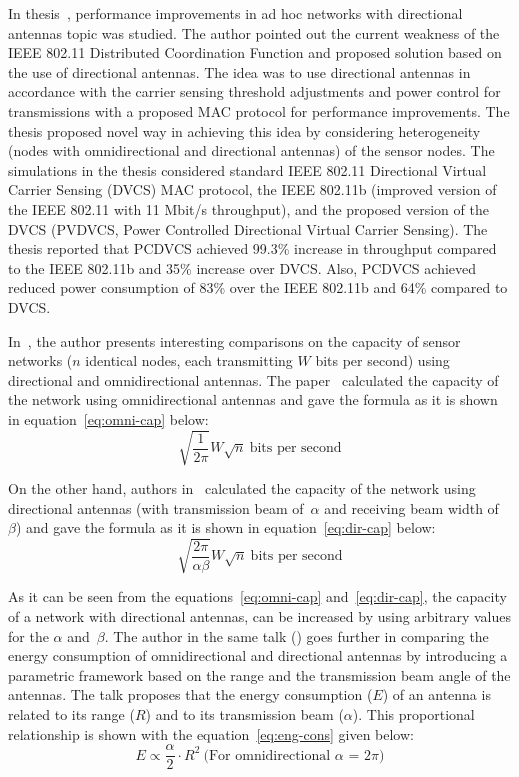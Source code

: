 \documentclass[12pt, oneandhalf, chaparabic, sees, ms]{metu}
\begin{document}
In thesis~\cite{bian2009}, performance improvements in ad hoc networks with directional antennas topic was studied. 
The author pointed out the current weakness of the IEEE 802.11
Distributed Coordination Function and proposed solution based on the use of directional antennas. 
The idea was to use directional antennas in accordance with the carrier sensing threshold adjustments and power control for transmissions 
with a proposed MAC protocol for performance improvements. The thesis proposed novel way in achieving this idea by considering 
heterogeneity (nodes with omnidirectional and directional antennas) of the sensor nodes. The simulations in the thesis considered standard
IEEE 802.11 Directional Virtual Carrier Sensing (DVCS) MAC protocol, the IEEE 802.11b (improved version of the IEEE 802.11 with 11 Mbit/s throughput), 
and the proposed version of the DVCS (PVDVCS, Power Controlled Directional Virtual Carrier Sensing).
The thesis reported that PCDVCS achieved 99.3\% increase in throughput compared to the IEEE 802.11b and 35\% increase over DVCS. 
Also, PCDVCS  achieved reduced power consumption of 83\% over the IEEE 802.11b and 64\% compared to DVCS.

In~\cite{kranakis2012}, the author presents interesting comparisons on the capacity of sensor networks ($n$ identical nodes, each transmitting $W$ bits per second) 
using directional and omnidirectional antennas. 
The paper~\cite{gupta2000} calculated the capacity of the network using omnidirectional antennas and gave the formula as it is shown in equation~\ref{eq:omni-cap} below: 
\begin{equation}
\sqrt{\frac{1}{2\pi}}W\sqrt{n}~\text{bits per second}\label{eq:omni-cap}
\end{equation}

On the other hand, authors in~\cite{yi2003} calculated the capacity of the network using directional antennas (with transmission beam of~$\alpha$ and receiving beam width of~$\beta$) 
and gave the formula as it is shown in equation~\ref{eq:dir-cap} below: 
\begin{equation}
\sqrt{\frac{2\pi}{\alpha\beta}}W\sqrt{n}~\text{bits per second}\label{eq:dir-cap}
\end{equation}

As it can be seen from the equations~\ref{eq:omni-cap} and~\ref{eq:dir-cap}, the capacity of a network with directional antennas, can be increased by using arbitrary
values for the $\alpha$ and~$\beta$. The author in the same talk (\cite{kranakis2012}) goes further in comparing the energy consumption of omnidirectional and directional antennas by
introducing a parametric framework based on the range and the transmission beam angle of the antennas. The talk proposes that the energy consumption ($E$) of an antenna is related to its 
range ($R$) and to its transmission beam ($\alpha$). This proportional relationship is shown with the equation~\ref{eq:eng-cons} given below:
\begin{equation}
E \propto \frac{\alpha}{2} \cdot R^2 ~\text{(For omnidirectional $\alpha$ = 2$\pi$)} \label{eq:eng-cons}
\end{equation}
\end{document}
